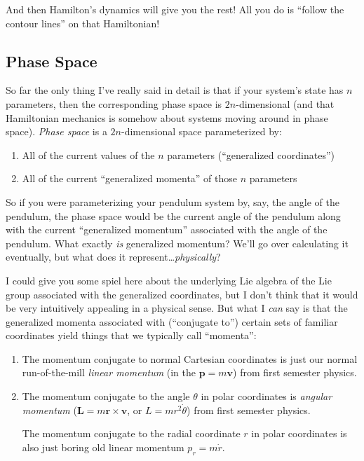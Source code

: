 \documentclass[]{article}
\begin{document}
And then Hamilton's dynamics will give you the rest! All you do is ``follow the
contour lines'' on that Hamiltonian!

\subsection{Phase Space}\label{phase-space}

So far the only thing I've really said in detail is that if your system's state
has \(n\) parameters, then the corresponding phase space is \(2n\)-dimensional
(and that Hamiltonian mechanics is somehow about systems moving around in phase
space). \emph{Phase space} is a \(2n\)-dimensional space parameterized by:

\begin{enumerate}
\def\labelenumi{\arabic{enumi}.}
\tightlist
\item
  All of the current values of the \(n\) parameters (``generalized
  coordinates'')
\item
  All of the current ``generalized momenta'' of those \(n\) parameters
\end{enumerate}

So if you were parameterizing your pendulum system by, say, the angle of the
pendulum, the phase space would be the current angle of the pendulum along with
the current ``generalized momentum'' associated with the angle of the pendulum.
What exactly \emph{is} generalized momentum? We'll go over calculating it
eventually, but what does it represent\ldots{}\emph{physically}?

I could give you some spiel here about the underlying Lie algebra of the Lie
group associated with the generalized coordinates, but I don't think that it
would be very intuitively appealing in a physical sense. But what I \emph{can}
say is that the generalized momenta associated with (``conjugate to'') certain
sets of familiar coordinates yield things that we typically call ``momenta'':

\begin{enumerate}
\def\labelenumi{\arabic{enumi}.}
\item
  The momentum conjugate to normal Cartesian coordinates is just our normal
  run-of-the-mill \emph{linear momentum} (in the \(\mathbf{p} = m \mathbf{v}\))
  from first semester physics.
\item
  The momentum conjugate to the angle \(\theta\) in polar coordinates is
  \emph{angular momentum} (\(\mathbf{L} = m \mathbf{r} \times \mathbf{v}\), or
  \(L = m r^2 \dot{\theta}\)) from first semester physics.

  The momentum conjugate to the radial coordinate \(r\) in polar coordinates is
  also just boring old linear momentum \(p_r = m \dot{r}\).
\end{enumerate}
\end{document}
